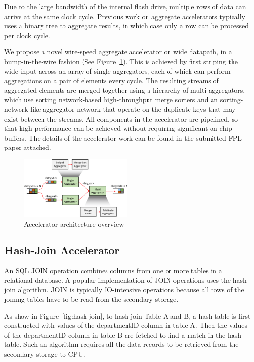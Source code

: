 \documentclass{article}
\begin{document}
Due to the large bandwidth of the internal flash drive, multiple rows of data can arrive at the same clock cycle.
Previous work on aggregate accelerators typically uses a binary tree to aggregate results, in which case only a row can be processed per clock cycle.

We propose a novel wire-speed aggregate accelerator on wide datapath, in a bump-in-the-wire fashion (See Figure~\ref{fig:arch-overview}).
This is achieved by first striping the wide input across an array of single-aggregators, each of which can perform aggregations on a pair of elements every cycle.
The resulting streams of aggregated elements are merged together using a hierarchy of multi-aggregators, which use sorting network-based high-throughput merge sorters and an sorting-network-like
aggregator network that operate on the duplicate keys that may exist between the streams.
All components in the accelerator are pipelined, so that high performance can be achieved without requiring significant on-chip buffers.
The details of the accelerator work can be found in the submitted FPL paper attached.

\begin{figure}[t]
    \centering
    \includegraphics[page=1, width=0.50\textwidth]{figures/figures-crop.pdf}
    \caption{Accelerator architecture overview}
    \label{fig:arch-overview}
	\vspace{-10pt}
\end{figure}

\subsection{Hash-Join Accelerator}
An SQL JOIN operation combines columns from one or more tables in a relational database.
A popular implementation of JOIN operations uses the hash join algorithm.
JOIN is typically IO-intensive operations because all rows of the joining tables have to be read from the secondary storage.

As show in Figure~\ref{fig:hash-join}, to hash-join Table A and B, a hash table is first constructed with values of the departmentID column in table A.
Then the values of the departmentID column in table B are fetched to find a match in the hash table.
Such an algorithm requires all the data records to be retrieved from the secondary storage to CPU.
\end{document}
